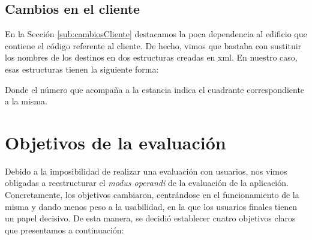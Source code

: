 %
%



\subsection{Cambios en el cliente}
\label{sub:cambiosCliente_vivienda}

En la Sección \ref{sub:cambiosCliente} destacamos la poca dependencia al edificio que contiene el código referente al cliente. De hecho, vimos que bastaba con sustituir los nombres de los destinos en dos estructuras creadas en xml. En nuestro caso, esas estructuras tienen la siguiente forma: 





Donde el número que acompaña a la estancia indica el cuadrante correspondiente a la misma.

\section{Objetivos de la evaluación}
\label{sec:objetivosEval}

Debido a la imposibilidad de realizar una evaluación con usuarios, nos vimos obligadas a reestructurar el \textit{modus operandi} de la evaluación de la aplicación. Concretamente, los objetivos cambiaron, centrándose en el funcionamiento de la misma y dando menos peso a la usabilidad, en la que los usuarios finales tienen un papel decisivo. De esta manera, se decidió establecer cuatro objetivos claros que presentamos a continuación:

